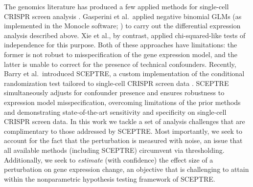 \documentclass[12pt]{article}
\begin{document}
The genomics literature has produced a few applied methods for single-cell CRISPR screen analysis \parencite{Gasperini2019,Xie2019a,Barry2021}. Gasperini et al.\ applied negative binomial GLMs (as implemented in the Monocle software; \cite{Trapnell2014}) to carry out the differential expression analysis described above. Xie et al., by contrast, applied chi-squared-like tests of independence for this purpose. Both of these approaches have limitations: the former is not robust to misspecification of the gene expression model, and the latter is unable to correct for the presence of technical confounders. Recently, Barry et al.\ introduced SCEPTRE, a custom implementation of the conditional randomization test \parencite{Candes2018, Liu2021} tailored to single-cell CRISPR screen data \parencite{Barry2021}. SCEPTRE simultaneously adjusts for confounder presence and ensures robustness to expression model misspecification, overcoming limitations of the prior methods and demonstrating state-of-the-art sensitivity and specificity on single-cell CRISPR screen data. In this work we tackle a set of analysis challenges that are complimentary to those addressed by SCEPTRE. Most importantly, we seek to account for the fact that the perturbation is measured with noise, an issue that all available methods (including SCEPTRE) circumvent via thresholding. Additionally, we seek to \textit{estimate} (with confidence) the effect size of a perturbation on gene expression change, an objective that is challenging to attain within the nonparametric hypothesis testing framework of SCEPTRE.
\end{document}
